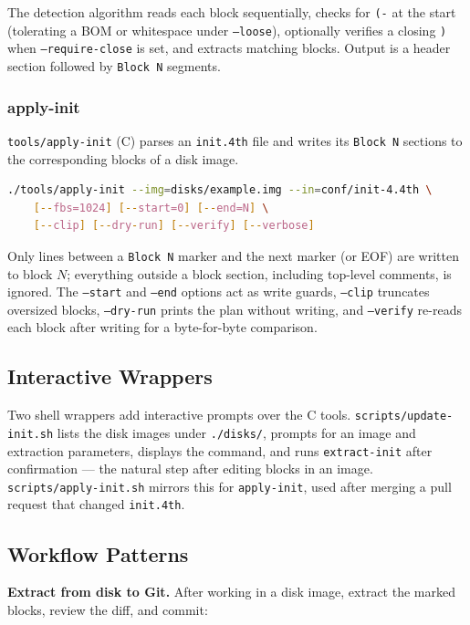 The detection algorithm reads each block sequentially, checks for \texttt{(-} at
the start (tolerating a BOM or whitespace under \texttt{--loose}), optionally
verifies a closing \texttt{)} when \texttt{--require-close} is set, and extracts
matching blocks. Output is a header section followed by \texttt{Block N}
segments.

\subsubsection{apply-init}

\texttt{tools/apply-init} (C) parses an \texttt{init.4th} file and writes its
\texttt{Block N} sections to the corresponding blocks of a disk image.

\begin{lstlisting}[language=bash]
./tools/apply-init --img=disks/example.img --in=conf/init-4.4th \
    [--fbs=1024] [--start=0] [--end=N] \
    [--clip] [--dry-run] [--verify] [--verbose]
\end{lstlisting}

Only lines between a \texttt{Block N} marker and the next marker (or EOF) are
written to block $N$; everything outside a block section, including top-level
comments, is ignored. The \texttt{--start} and \texttt{--end} options act as
write guards, \texttt{--clip} truncates oversized blocks, \texttt{--dry-run}
prints the plan without writing, and \texttt{--verify} re-reads each block after
writing for a byte-for-byte comparison.

\subsection{Interactive Wrappers}

Two shell wrappers add interactive prompts over the C tools.
\texttt{scripts/update-init.sh} lists the disk images under \texttt{./disks/},
prompts for an image and extraction parameters, displays the command, and runs
\texttt{extract-init} after confirmation --- the natural step after editing
blocks in an image. \texttt{scripts/apply-init.sh} mirrors this for
\texttt{apply-init}, used after merging a pull request that changed
\texttt{init.4th}.

\subsection{Workflow Patterns}

\textbf{Extract from disk to Git.} After working in a disk image, extract the
marked blocks, review the diff, and commit:

